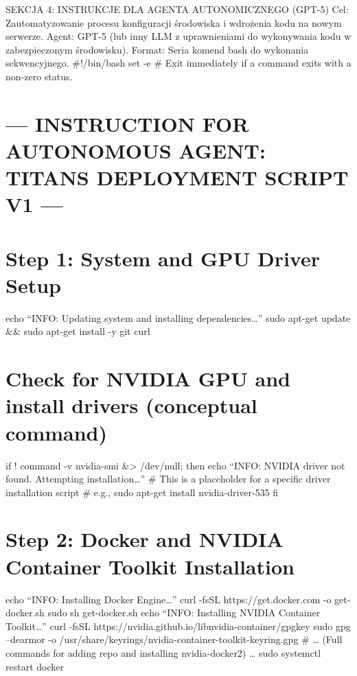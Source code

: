 \documentclass[letterpaper,twocolumn]{article}
\begin{document}
SEKCJA 4: INSTRUKCJE DLA AGENTA AUTONOMICZNEGO (GPT-5) Cel:
Zautomatyzowanie procesu konfiguracji środowiska i wdrożenia kodu na
nowym serwerze. Agent: GPT-5 (lub inny LLM z uprawnieniami do
wykonywania kodu w zabezpieczonym środowisku). Format: Seria komend bash
do wykonania sekwencyjnego. \#!/bin/bash set -e \# Exit immediately if a
command exits with a non-zero status.

\hypertarget{instruction-for-autonomous-agent-titans-deployment-script-v1}{%
\section{--- INSTRUCTION FOR AUTONOMOUS AGENT: TITANS DEPLOYMENT SCRIPT
V1
---}\label{instruction-for-autonomous-agent-titans-deployment-script-v1}}

\hypertarget{step-1-system-and-gpu-driver-setup}{%
\section{Step 1: System and GPU Driver
Setup}\label{step-1-system-and-gpu-driver-setup}}

echo ``INFO: Updating system and installing dependencies\ldots{}'' sudo
apt-get update \&\& sudo apt-get install -y git curl

\hypertarget{check-for-nvidia-gpu-and-install-drivers-conceptual-command}{%
\section{Check for NVIDIA GPU and install drivers (conceptual
command)}\label{check-for-nvidia-gpu-and-install-drivers-conceptual-command}}

if ! command -v nvidia-smi \&\textgreater{} /dev/null; then echo ``INFO:
NVIDIA driver not found. Attempting installation\ldots{}'' \# This is a
placeholder for a specific driver installation script \# e.g., sudo
apt-get install nvidia-driver-535 fi

\hypertarget{step-2-docker-and-nvidia-container-toolkit-installation}{%
\section{Step 2: Docker and NVIDIA Container Toolkit
Installation}\label{step-2-docker-and-nvidia-container-toolkit-installation}}

echo ``INFO: Installing Docker Engine\ldots{}'' curl -fsSL
https://get.docker.com -o get-docker.sh sudo sh get-docker.sh echo
``INFO: Installing NVIDIA Container Toolkit\ldots{}'' curl -fsSL
https://nvidia.github.io/libnvidia-container/gpgkey \textbar{} sudo gpg
--dearmor -o /usr/share/keyrings/nvidia-container-toolkit-keyring.gpg \#
\ldots{} (Full commands for adding repo and installing nvidia-docker2)
\ldots{} sudo systemctl restart docker
\end{document}
